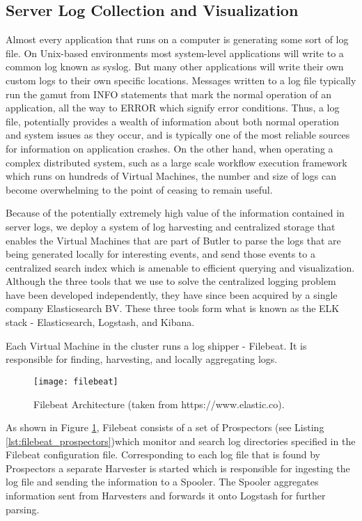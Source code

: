 \subsection{Server Log Collection and Visualization} 
\label{sec:design_log_collection}

Almost every application that runs on a computer is generating some sort of log file. On Unix-based environments most system-level applications will write to a common log known as syslog. But many other applications will write their own custom logs to their own specific locations. Messages written to a log file typically run the gamut from INFO statements that mark the normal operation of an application, all the way to ERROR which signify error conditions. Thus, a log file, potentially provides a wealth of information about both normal operation and system issues as they occur, and is typically one of the most reliable sources for information on application crashes. On the other hand, when operating a complex distributed system, such as a large scale workflow execution framework which runs on hundreds of Virtual Machines, the number and size of logs can become overwhelming to the point of ceasing to remain useful.  

Because of the potentially extremely high value of the information contained in server logs, we deploy a system of log harvesting and centralized storage that enables the Virtual Machines that are part of Butler to parse the logs that are being generated locally for interesting events, and send those events to a centralized search index which is amenable to efficient querying and visualization. Although the three tools that we use to solve the centralized logging problem have been developed independently, they have since been acquired by a single company Elasticsearch BV. These three tools form what is known as the ELK stack - Elasticsearch\autocite{Elasticsearch}, Logstash\autocite{Logstash}, and Kibana\autocite{Kibana}.

Each Virtual Machine in the cluster runs a log shipper - Filebeat. It is responsible for finding, harvesting, and locally aggregating logs.

\begin{figure}[h]
\texttt{[image: filebeat]}
\centering
\caption {Filebeat Architecture (taken from https://www.elastic.co).}
\label{fig:filebeat}
\end{figure}

As shown in Figure \ref{fig:filebeat}, Filebeat consists of a set of Prospectors (see Listing \ref{lst:filebeat_prospectors})which monitor and search log directories specified in the Filebeat configuration file. Corresponding to each log file that is found by Prospectors a separate Harvester is started which is responsible for ingesting the log file and sending the information to a Spooler. The Spooler aggregates information sent from Harvesters and forwards it onto Logstash for further parsing.

